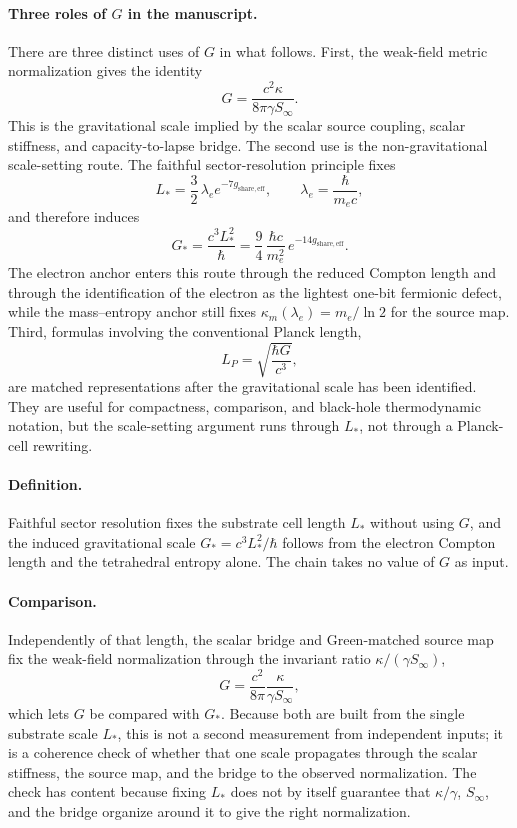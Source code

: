 \documentclass[11pt]{article}
\begin{document}
\paragraph{Three roles of \(G\) in the manuscript.}
There are three distinct uses of $G$ in what follows. First, the weak-field metric normalization gives the identity
\[
G=\frac{c^2\kappa}{8\pi\gamma S_\infty}.
\]
This is the gravitational scale implied by the scalar source coupling, scalar stiffness, and capacity-to-lapse bridge. The second use is the non-gravitational scale-setting route. The faithful sector-resolution principle fixes
\[
L_*=\frac32\,\lambda_e e^{-7g_{\mathrm{share,eff}}},
\qquad
\lambda_e=\frac{\hbar}{m_ec},
\]
and therefore induces
\[
G_*=\frac{c^3L_*^2}{\hbar}
=
\frac94\,\frac{\hbar c}{m_e^2}\,e^{-14g_{\mathrm{share,eff}}}.
\]
The electron anchor enters this route through the reduced Compton length and through the identification of the electron as the lightest one-bit fermionic defect, while the mass--entropy anchor still fixes $\kappa_m(\lambda_e)=m_e/\ln2$ for the source map. Third, formulas involving the conventional Planck length,
\[
L_P=\sqrt{\frac{\hbar G}{c^3}},
\]
are matched representations after the gravitational scale has been identified. They are useful for compactness, comparison, and black-hole thermodynamic notation, but the scale-setting argument runs through $L_*$, not through a Planck-cell rewriting.

\paragraph{Definition.} Faithful sector resolution fixes the substrate cell length $L_*$ without using $G$, and the induced gravitational scale $G_*=c^3L_*^2/\hbar$ follows from the electron Compton length and the tetrahedral entropy alone. The chain takes no value of $G$ as input.

\paragraph{Comparison.} Independently of that length, the scalar bridge and Green-matched source map fix the weak-field normalization through the invariant ratio $\kappa/(\gamma S_\infty)$,
\[
G=\frac{c^2}{8\pi}\frac{\kappa}{\gamma S_\infty},
\]
which lets $G$ be compared with $G_*$. Because both are built from the single substrate scale $L_*$, this is not a second measurement from independent inputs; it is a coherence check of whether that one scale propagates through the scalar stiffness, the source map, and the bridge to the observed normalization. The check has content because fixing $L_*$ does not by itself guarantee that $\kappa/\gamma$, $S_\infty$, and the bridge organize around it to give the right normalization.
\end{document}
